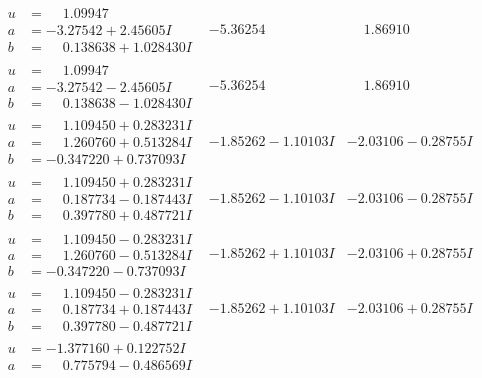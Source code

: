 \documentclass[1p]{elsarticle_modified}
\theoremstyle{definition}
\begin{document}
$$\begin{array}{c|c|c}
\begin{aligned}
u &= \phantom{-}1.09947\phantom{ +0.000000I} \\
a &= -3.27542 + 2.45605 I \\
b &= \phantom{-}0.138638 + 1.028430 I\end{aligned}
 & -5.36254\phantom{ +0.000000I} & \phantom{-}1.86910\phantom{ +0.000000I} \\ \hline\begin{aligned}
u &= \phantom{-}1.09947\phantom{ +0.000000I} \\
a &= -3.27542 - 2.45605 I \\
b &= \phantom{-}0.138638 - 1.028430 I\end{aligned}
 & -5.36254\phantom{ +0.000000I} & \phantom{-}1.86910\phantom{ +0.000000I} \\ \hline\begin{aligned}
u &= \phantom{-}1.109450 + 0.283231 I \\
a &= \phantom{-}1.260760 + 0.513284 I \\
b &= -0.347220 + 0.737093 I\end{aligned}
 & -1.85262 - 1.10103 I & -2.03106 - 0.28755 I \\ \hline\begin{aligned}
u &= \phantom{-}1.109450 + 0.283231 I \\
a &= \phantom{-}0.187734 - 0.187443 I \\
b &= \phantom{-}0.397780 + 0.487721 I\end{aligned}
 & -1.85262 - 1.10103 I & -2.03106 - 0.28755 I \\ \hline\begin{aligned}
u &= \phantom{-}1.109450 - 0.283231 I \\
a &= \phantom{-}1.260760 - 0.513284 I \\
b &= -0.347220 - 0.737093 I\end{aligned}
 & -1.85262 + 1.10103 I & -2.03106 + 0.28755 I \\ \hline\begin{aligned}
u &= \phantom{-}1.109450 - 0.283231 I \\
a &= \phantom{-}0.187734 + 0.187443 I \\
b &= \phantom{-}0.397780 - 0.487721 I\end{aligned}
 & -1.85262 + 1.10103 I & -2.03106 + 0.28755 I \\ \hline\begin{aligned}
u &= -1.377160 + 0.122752 I \\
a &= \phantom{-}0.775794 - 0.486569 I \\

\end{aligned}
\end{array}$$
\end{document}
